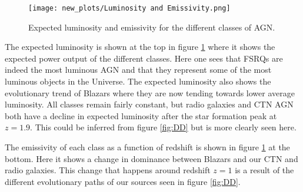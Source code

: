 \begin{figure}
    \centering
    \texttt{[image: new\_plots/Luminosity and Emissivity.png]}
    \caption{Expected luminosity and emissivity for the different classes of AGN.   }
    \label{fig:EL}
\end{figure}



The expected luminosity is shown at the top in figure \ref*{fig:EL} where it shows the expected power output of the different classes. Here one sees that FSRQs are indeed the most luminous AGN and 
that they represent some of the most luminous objects in the Universe.
The expected luminosity also shows the evolutionary trend of Blazars where they are now tending towards lower average luminosity. 
All classes remain fairly constant, but radio galaxies and CTN AGN both have a decline in expected luminosity after the star formation peak at $z=1.9$. This could be inferred from figure \ref*{fig:DD} but is more clearly seen here.

The emissivity of each class as a function of redshift is shown in figure \ref*{fig:EL} at the bottom. Here it shows a change in dominance between Blazars and our CTN and radio galaxies.
This change that happens around redshift $z=1$ is a result of the different evolutionary paths of our sources seen in figure \ref*{fig:DD}.


